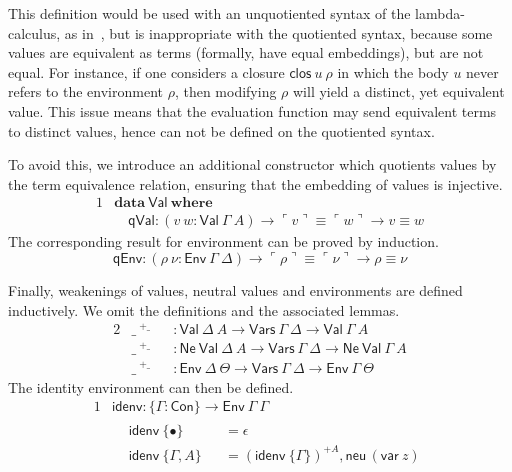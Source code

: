 \documentclass[a4paper,english,cleveref,autoref,draft]{lipics-v2019}
\newcommand{\agdaSymb}[1]{\mathsf{#1}}
\newcommand{\agdaKW}[1]{\mathbf{#1}}
\newcommand{\ind}{\hspace{1em}}
\newcommand{\data}{\agdaKW{data}}
\newcommand{\where}{\agdaKW{where}}
\newcommand{\Con}{\agdaSymb{Con}}
\newcommand{\Vars}{\agdaSymb{Vars}}
\newcommand{\Ne}{\agdaSymb{Ne}}
\newcommand{\Val}{\agdaSymb{Val}}
\newcommand{\Env}{\agdaSymb{Env}}
\newcommand{\NV}{\Ne\ \Val}
\newcommand{\var}{\agdaSymb{var}}
\newcommand{\neu}{\agdaSymb{neu}}
\newcommand{\clos}{\agdaSymb{clos}}
\newcommand{\qVal}{\agdaSymb{qVal}}
\newcommand{\qEnv}{\agdaSymb{qEnv}}
\newcommand{\idenv}{\agdaSymb{idenv}}
\newcommand{\cul}{\ulcorner}
\newcommand{\cur}{\urcorner}
\begin{document}
This definition would be used with an unquotiented syntax of the lambda-calculus,
as in~\cite{chapman2009bsn}, but is inappropriate with the quotiented syntax,
because some values are equivalent as terms (formally, have equal embeddings),
but are not equal.
For instance, if one considers a closure $\clos\ u\ \rho$ in which the body
$u$ never refers to the environment $\rho$, then modifying $\rho$ will yield
a distinct, yet equivalent value.
This issue means that the evaluation function may send equivalent terms to
distinct values, hence can not be defined on the quotiented syntax.

To avoid this, we introduce an additional constructor which quotients values
by the term equivalence relation, ensuring that the embedding of values is
injective.
\begin{alignat*}{1}
  & \data\ \Val\ \where \\
  & \ind \qVal : (v\ w : \Val\ \Gamma\ A) \to \cul v \cur \equiv \cul w \cur \to v \equiv w
\end{alignat*}
The corresponding result for environment can be proved by induction.
\[ \qEnv : (\rho\ \nu : \Env\ \Gamma\ \Delta) \to \cul \rho \cur \equiv \cul \nu \cur \to \rho \equiv \nu \]

Finally, weakenings of values, neutral values and environments are defined
inductively. We omit the definitions and the associated lemmas.
\begin{alignat*}{2}
  & \_\ ^{+\_} && : \Val\ \Delta\ A \to \Vars\ \Gamma\ \Delta \to \Val\ \Gamma\ A \\
  & \_\ ^{+\_} && : \NV\ \Delta\ A \to \Vars\ \Gamma\ \Delta \to \NV\ \Gamma\ A \\
  & \_\ ^{+\_} && : \Env\ \Delta\ \Theta \to \Vars\ \Gamma\ \Delta \to \Env\ \Gamma\ \Theta
\end{alignat*}
The identity environment can then be defined.
\begin{alignat*}{1}
  & \idenv : \{\Gamma : \Con\} \to \Env\ \Gamma\ \Gamma \\ &
  \begin{alignedat}{2}
    & \idenv\ \{\bullet\} && = \epsilon \\
    & \idenv\ \{\Gamma,A\} && = (\idenv\ \{\Gamma\})^{+A}, \neu\,(\var\ z)
  \end{alignedat}
\end{alignat*}
\end{document}
